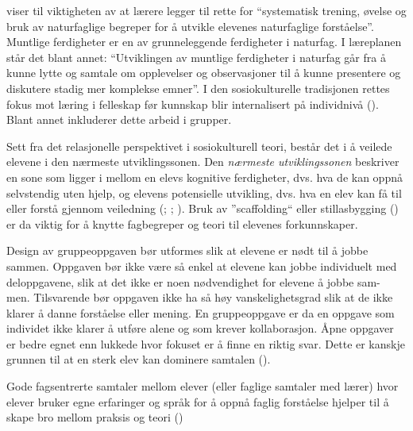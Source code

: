 \documentclass[main.tex]{subfiles}
\begin{document}
 viser til viktigheten av at lærere legger til rette for ``systematisk trening, øvelse og bruk av naturfaglige begreper for å utvikle elevenes naturfaglige forståelse''. Muntlige ferdigheter er en av grunneleggende ferdigheter i naturfag. I læreplanen står det blant annet: ``Utviklingen av muntlige ferdigheter i naturfag går fra å kunne lytte og samtale om opplevelser og observasjoner til å kunne presentere og diskutere stadig mer komplekse emner''. I den sosiokulturelle tradisjonen rettes fokus mot læring i felleskap før kunnskap blir internalisert på individnivå (). Blant annet inkluderer dette arbeid i grupper.

Sett fra det relasjonelle perspektivet i sosiokulturell teori, består det i å veilede elevene i den nærmeste utviklingssonen. Den \emph{nærmeste utviklingssonen} beskriver en sone som ligger i mellom en elevs kognitive ferdigheter, dvs. hva de kan oppnå selvstendig uten hjelp, og elevens potensielle utvikling, dvs. hva en elev kan få til eller forstå gjennom veiledning (; ; ). Bruk av ''scaffolding`` eller stillasbygging () er da viktig for å knytte fagbegreper og teori til elevenes forkunnskaper.

Design av gruppeoppgaven bør utformes slik at
elevene er nødt til å jobbe sammen. Oppgaven bør ikke være så enkel at elevene kan jobbe
individuelt med deloppgavene, slik at det ikke er noen nødvendighet for elevene å jobbe sam-
men. Tilsvarende bør oppgaven ikke ha så høy vanskelighetsgrad slik at de ikke klarer å danne
forståelse eller mening. En gruppeoppgave er da en oppgave som individet ikke klarer å utføre
alene og som krever kollaborasjon. Åpne oppgaver er bedre egnet enn lukkede hvor fokuset er
å finne en riktig svar. Dette er kanskje grunnen til at en sterk elev kan dominere samtalen 
().

Gode fagsentrerte samtaler mellom elever (eller faglige samtaler med lærer) hvor elever bruker egne erfaringer og språk for å oppnå faglig forståelse hjelper til å skape bro mellom praksis og teori ()
\end{document}
